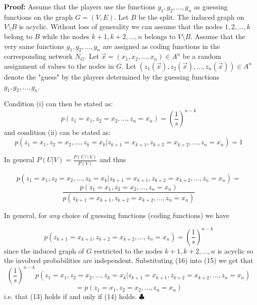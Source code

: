 \documentclass[12pt]{article}
\begin{document}
\noindent
{\bf Proof:} Assume that  the players use the functions $g_1,g_2, \ldots,g_n$ as guessing functions on the graph $G=(V,E)$. Let $B$ be the split. The induced graph on $V \setminus B$ is acyclic. Without loss of generality we can assume 
that the nodes $1,2, \ldots,k$  belong to $B$ while the nodes $k+1,k+2, \ldots,n$ belongs to $V \setminus B$. Assume that the very same functions $g_1,g_2, \ldots, g_n$
are assigned as coding functions in the corresponding network $N_G$. 
Let $\vec{x}=(x_1,x_2,\ldots,x_n)\in A^n$ be a random assignment of values to the nodes in $G$.
Let $(z_1(\vec{x}),z_2(\vec{x}),\ldots,z_n(\vec{x}))\in A^n$ denote the "guess" by the players determined
by the guessing functions $g_1,g_2, \ldots,g_n$. 

Condition (i) can then be stated as:
\begin{equation}
p(z_{1}=x_{1}, z_{2}=x_{2}, \ldots, z_{n}=x_{n})= (\frac{1}{s})^{n-k}
\end{equation}
and condition (ii) can be stated as:
\begin{equation}
p(z_1=x_1, z_2=x_2, \ldots, z_k=x_k | z_{k+1}=x_{k+1}, z_{k+2}=x_{k+2}, \ldots, z_{n}=x_{n})=1
\end{equation}

In general $P(U | V)= \frac{P(U \cap V)}{P(V)}$ and thus

\[p(z_1=x_1, z_2=x_2, \ldots, z_k=x_k | z_{k+1}=x_{k+1}, z_{k+2}=x_{k+2}, \ldots, z_{n}=x_{n})=\]
\begin{equation}
\frac{ p(z_{1}=x_{1}, z_{2}=x_{2}, \ldots, z_{n}=x_{n})}{ p(z_{k+1}=x_{k+1}, z_{k+2}=x_{k+2}, \ldots, z_{n}=x_{n})} 
\end{equation}

In general,  for  {\it any} choice of guessing functions (coding functions)
we have

\begin{equation}
p(z_{k+1}=x_{k+1}, z_{k+2}=x_{k+2}, \ldots, z_{n}=x_{n})= (\frac{1}{s})^{n-k}
\end{equation}
since the induced graph of $G$ restricted to the nodes $k+1,k+2, \ldots,n$ is acyclic
so the involved probabilities are independent. Substituting (16) into (15) we get that
\[ (\frac{1}{s})^{n-k} p(z_1=x_1, z_2=x_2, \ldots, z_k=x_k | z_{k+1}=x_{k+1}, z_{k+2}=x_{k+2}, \ldots, z_{n}=x_{n})\]
\begin{equation}
= p(z_{1}=x_{1}, z_{2}=x_{2}, \ldots, z_{n}=x_{n})
\end{equation}
i.e. that (13) holds if and only if (14) holds. \hfill $\clubsuit$
\end{document}
